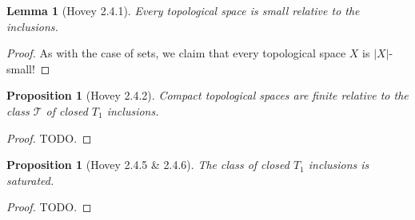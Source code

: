 \documentclass{amsart}
\theoremstyle{plain}
\newtheorem{proposition}[theorem]{Proposition}
\newtheorem{lemma}[theorem]{Lemma}
\theoremstyle{definition}
\newcommand{\0}{\mathbf{0}}
\newcommand{\cT}{\mathcal T}
\renewcommand{\(}{\left(}
\renewcommand{\)}{\right)}
\begin{document}
\begin{lemma}[Hovey 2.4.1]\label{2.4.1}
  Every topological space is small relative to the inclusions.
\end{lemma}
\begin{proof}
  As with the case of sets, we claim that every topological space $X$ is $|X|$-small!
\end{proof}

\begin{proposition}[Hovey 2.4.2]\label{2.4.2}
  Compact topological spaces are finite relative to the class $\cT$ of closed $T_1$ inclusions.
\end{proposition}
\begin{proof}
  \color{red}TODO.
\end{proof}

\begin{proposition}[Hovey 2.4.5 \& 2.4.6]\label{2.4.5-6}
  The class of closed $T_1$ inclusions is saturated.
\end{proposition}
\begin{proof}
  \color{red}TODO.
\end{proof}
\end{document}
